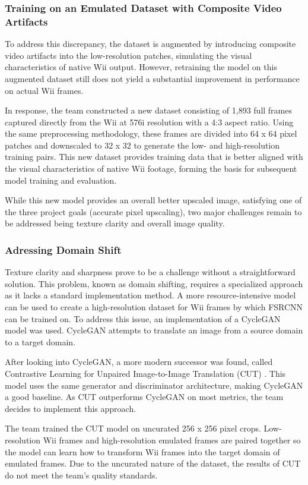 \documentclass{article}
\begin{document}
        \subsubsection{Training on an Emulated Dataset with Composite Video Artifacts}
            \noindent To address this discrepancy, the dataset is augmented by introducing composite video artifacts into the low-resolution patches, simulating the visual characteristics of native Wii output. However, retraining the model on this augmented dataset still does not yield a substantial improvement in performance on actual Wii frames.
            \par  In response, the team constructed a new dataset consisting of 1,893 full frames captured directly from the Wii at 576i resolution with a 4:3 aspect ratio. Using the same preprocessing methodology, these frames are divided into 64 x 64 pixel patches and downscaled to 32 x 32 to generate the low- and high-resolution training pairs. This new dataset provides training data that is better aligned with the visual characteristics of native Wii footage, forming the basis for subsequent model training and evaluation.
            \par While this new model provides an overall better upscaled image, satisfying one of the three project goals (accurate pixel upscaling), two major challenges remain to be addressed being texture clarity and overall image quality.
        
        \subsubsection{Adressing Domain Shift}
            \noindent Texture clarity and sharpness prove to be a challenge without a straightforward solution. This problem, known as domain shifting, requires a specialized approach as it lacks a standard implementation method. A more resource-intensive model can be used to create a high-resolution dataset for Wii frames by which FSRCNN can be trained on. To address this issue, an implementation of a CycleGAN model \cite{zhu_unpaired_2020} was used. CycleGAN attempts to translate an image from a source domain to a target domain.
            \par After looking into CycleGAN, a more modern successor was found, called Contrastive Learning for Unpaired Image-to-Image Translation (CUT) \cite{park_contrastive_2020}. This model uses the same generator and discriminator architecture, making CycleGAN a good baseline. As CUT outperforms CycleGAN on most metrics, the team decides to implement this approach.
            \par The team trained the CUT model on uncurated 256 x 256 pixel crops. Low-resolution Wii frames and high-resolution emulated frames are paired together so the model can learn how to transform Wii frames into the target domain of emulated frames. Due to the uncurated nature of the dataset, the results of CUT do not meet the team's quality standards. 
\end{document}
